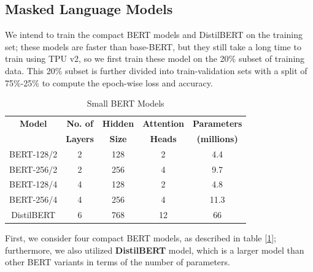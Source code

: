 \documentclass[11pt]{article}
\begin{document}
\subsection{Masked Language Models} 
We intend to train the compact BERT models and DistilBERT on the training set; these models are  faster than base-BERT, but they still take a long time to train using TPU v2, so we first train these model on the 20\% subset of training data. This 20\% subset is further divided into train-validation sets with a split of 75\%-25\% to compute the epoch-wise loss and accuracy.
 \begin{table}[h!]
 \scriptsize
     \centering
     \begin{tabular}{c c c c c}
     \hline 
        \textbf{Model} & \textbf{No. of}  & \textbf{Hidden} & \textbf{Attention} & \textbf{Parameters} \\
        &\textbf{Layers}& \textbf{Size} & \textbf{Heads} & \textbf{(millions)} \\
        \hline 
         {BERT-128/2} &2 & 128& 2 & 4.4\\ 
          {BERT-256/2} & 2& 256& 4  &9.7\\  
          {BERT-128/4} & 4& 128& 2 &4.8\\  
         {BERT-256/4} & 4& 256& 4 &11.3\\   
         {DistilBERT} & 6& 768& 12&66\\    
         \hline   
     \end{tabular}
     \caption{Small BERT Models}
     \label{tab:sbert_distil}
 \end{table}
First, we consider four compact BERT models, as described in table [\ref{tab:sbert_distil}]; furthermore, we also utilized \textbf{DistilBERT} model, which is a larger model than other BERT variants in terms of the number of parameters.
\end{document}

